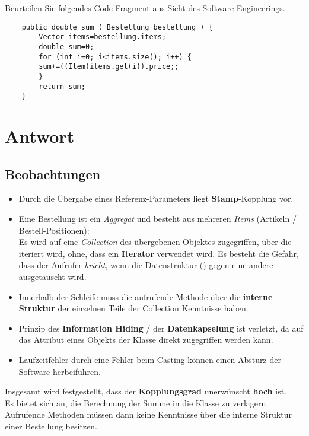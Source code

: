Beurteilen Sie folgendes Code-Fragment aus Sicht des Software Engineerings.

\begin{verbatim}
    public double sum ( Bestellung bestellung ) {
        Vector items=bestellung.items;
        double sum=0;
        for (int i=0; i<items.size(); i++) {
        sum+=((Item)items.get(i)).price;;
        }
        return sum;
    }
\end{verbatim}

\section*{Antwort}

\subsection*{Beobachtungen}
\begin{itemize}
    \item Durch die Übergabe eines Referenz-Parameters liegt \textbf{Stamp}-Kopplung vor.
    \item Eine Bestellung ist ein \textit{Aggregat} und besteht aus mehreren \textit{Items} (Artikeln / Bestell-Positionen):\\
    Es wird auf eine \textit{Collection} des übergebenen Objektes zugegriffen, über die iteriert wird, ohne, dass ein \textbf{Iterator} verwendet wird.
    Es besteht die Gefahr, dass der Aufrufer \textit{bricht}, wenn die Datenstruktur () gegen eine andere ausgetauscht wird.
    \item Innerhalb der Schleife muss die aufrufende Methode über die \textbf{interne Struktur} der einzelnen Teile der Collection Kenntnisse haben.
    \item Prinzip des \textbf{Information Hiding} / der \textbf{Datenkapselung} ist verletzt, da auf das Attribut  eines Objekts der Klasse  direkt zugegriffen werden kann.
    \item Laufzeitfehler durch eine Fehler beim Casting können einen Absturz der Software herbeiführen.
\end{itemize}

\noindent
Insgesamt wird festgestellt, dass der \textbf{Kopplungsgrad} unerwünscht \textbf{hoch} ist.\\

\noindent
Es bietet sich an, die Berechnung der Summe in die Klasse  zu verlagern.\\
Aufrufende Methoden müssen dann keine Kenntnisse über die interne Struktur einer Bestellung besitzen.